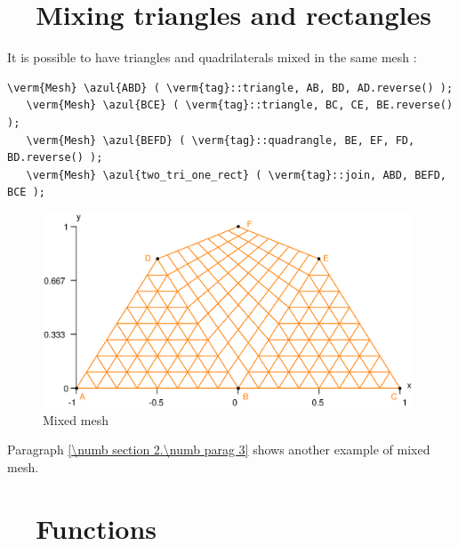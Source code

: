 \section{~~Mixing triangles and rectangles}\label{\numb section 1.\numb parag 5}

It is possible to have triangles and quadrilaterals mixed in the same mesh :

\begin{Verbatim}[commandchars=\\\{\},formatcom=\small\tt,frame=single,
   label=parag-\ref{\numb section 1.\numb parag 5}.cpp,rulecolor=\color{coment},
   baselinestretch=0.94,framesep=2mm]
   \verm{Mesh} \azul{ABD} ( \verm{tag}::triangle, AB, BD, AD.reverse() );
   \verm{Mesh} \azul{BCE} ( \verm{tag}::triangle, BC, CE, BE.reverse() );
   \verm{Mesh} \azul{BEFD} ( \verm{tag}::quadrangle, BE, EF, FD, BD.reverse() );
   \verm{Mesh} \azul{two_tri_one_rect} ( \verm{tag}::join, ABD, BEFD, BCE );
\end{Verbatim}

\begin{figure}[ht] \centering
  \includegraphics[width=110mm]{two-tri-one-rect}
  \caption{Mixed mesh}
  \label{\numb section 1.\numb fig 8}
\end{figure}

Paragraph \ref{\numb section 2.\numb parag 3} shows another example of mixed mesh.


\section{~~Functions}\label{\numb section 1.\numb parag 6}

